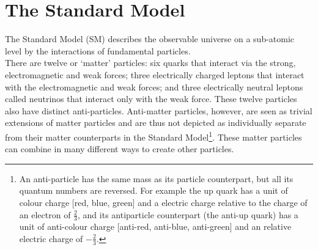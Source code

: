 \section{The Standard Model}
The Standard Model (SM) describes the observable universe on a sub-atomic level by the interactions of fundamental particles.\\

There are twelve  or `matter' particles: six quarks that interact via the strong, electromagnetic and weak forces; three electrically charged leptons that interact with the electromagnetic and weak forces; and three electrically neutral leptons called neutrinos that interact only with the weak force. These twelve particles also have distinct anti-particles. Anti-matter particles, however, are seen as trivial extensions of matter particles and are thus not depicted as individually separate from their matter counterparts in the Standard Model\footnote{An anti-particle has the same mass as its particle counterpart, but all its quantum numbers are reversed. For example the up quark has a unit of colour charge [red, blue, green] and a electric charge relative to the charge of an electron of $\frac{2}{3}$, and its antiparticle counterpart (the anti-up quark) has a unit of anti-colour charge [anti-red, anti-blue, anti-green] and an relative electric charge of $-\frac{2}{3}$.}. These matter particles can combine in many different ways to create other particles.\\

